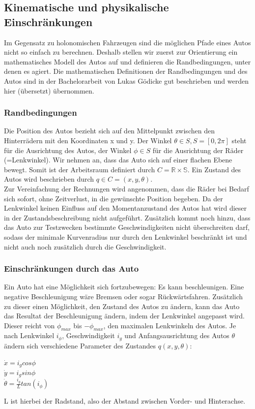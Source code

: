 \subsection{Kinematische und physikalische Einschränkungen}
Im Gegensatz zu holonomischen Fahrzeugen sind die möglichen Pfade eines Autos nicht so einfach zu berechnen. Deshalb stellen wir zuerst zur Orientierung ein mathematisches Modell des Autos auf und definieren die Randbedingungen, unter denen es agiert.
Die mathematischen Definitionen der Randbedingungen und des Autos sind in der Bachelorarbeit von Lukas Gödicke \citep{Goedicke18} gut beschrieben und werden hier (übersetzt) übernommen. \\
\subsubsection{Randbedingungen}
Die Position des Autos bezieht sich auf den Mittelpunkt zwischen den Hinterrädern mit den Koordinaten x und y. Der Winkel $\theta \in S,  S=[0,2\pi]$ steht für die Ausrichtung des Autos, der Winkel $\phi \in S$ für die Ausrichtung der Räder (=Lenkwinkel). Wir nehmen an, dass das Auto sich auf einer flachen Ebene bewegt. Somit ist der Arbeitsraum definiert durch $C =  \mathbb{R \times S}$. Ein Zustand des Autos wird beschrieben durch $q \in C = (x,y,\theta)$.\\
Zur Vereinfachung der Rechnungen wird angenommen, dass die Räder bei Bedarf sich sofort, ohne Zeitverlust, in die gewünschte Position begeben. Da der Lenkwinkel keinen Einfluss auf den Momentanzustand des Autos hat wird dieser in der Zustandsbeschreibung nicht aufgeführt. Zusätzlich kommt noch hinzu, dass das Auto zur Testzwecken bestimmte Geschwindigkeiten nicht überschreiten darf, sodass der minimale Kurvenradius nur durch den Lenkwinkel beschränkt ist und nicht auch noch zusätzlich durch die Geschwindigkeit. \\

\subsubsection{Einschränkungen durch das Auto}
Ein Auto hat eine Möglichkeit sich fortzubewegen: Es kann beschleunigen. Eine negative Beschleunigung wäre Bremsen oder sogar Rückwärtsfahren. Zusätzlich zu dieser einen Möglichkeit, den Zustand des Autos zu ändern, kann das Auto das Resultat der Beschleunigung ändern, indem der Lenkwinkel angepasst wird. Dieser reicht von $\phi_{max}$ bis $-\phi_{max}$, den maximalen Lenkwinkeln des Autos.
Je nach Lenkwinkel $i_{\phi}$, Geschwindigkeit $i_g$ und Anfangsausrichtung des Autos $\theta$ ändern sich verschiedene Parameter des Zustandes $q(x,y, \theta) $: \\
\begin{center}
$ \dot{x} = i_g cos \phi $ \\
$ \dot{y} = i_g sin \phi$ \\
$ \dot{{\theta}} = \frac{i_g}{L} tan (i_{\phi}) $
\end{center}
L ist hierbei der Radstand, also der Abstand zwischen Vorder- und Hinterachse.

